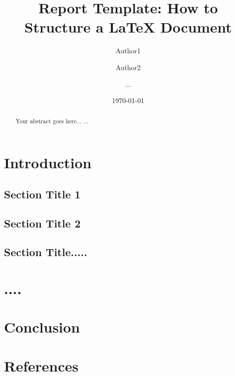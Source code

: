 \documentclass[11pt,a4paper]{report}\n\n
\begin{document}
\n
\title{Report Template: How to Structure a LaTeX Document}\n
\author{Author1 \and Author2 \and ...}\n
\date{\today}\n
\maketitle\n\n

\begin{abstract}\n
Your abstract goes here...\n
...\n
\end{abstract}\n\n

\chapter{Introduction}\n
\section{Section Title 1}\n
\section{Section Title 2}\n
\section{Section Title.....}\n\n

\chapter{....}\n\n

\chapter{Conclusion}\n\n\n


\chapter*{References}\n\n
\end{document}
